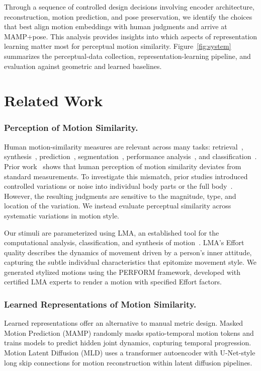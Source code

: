\documentclass[letterpaper]{article} %
\begin{document}
Through a sequence of controlled design decisions involving encoder architecture, reconstruction, motion prediction, and pose preservation, we identify the choices that best align motion embeddings with human judgments and arrive at MAMP+pose. This analysis provides insights into which aspects of representation learning matter most for perceptual motion similarity.  Figure~\ref{fig:system} summarizes the perceptual-data collection, representation-learning pipeline, and evaluation against geometric and learned baselines.

\section{Related Work}
\label{sec:related}

\subsubsection{Perception of Motion Similarity.}
 Human motion-similarity measures are relevant across many tasks: retrieval~\citep{Wang2015, Aristidou2018}, synthesis~\citep{Kovar2002}, prediction~\citep{Fragkiadaki2015, Martinez2017},  segmentation~\citep{Aristidou2018},  performance analysis~\citep{Chua2003}, and classification~\citep{Muller2006}.  Prior work~\citep{Durupinar2021-zk, Etemad2016-sg, Tang2008-pa} shows that human perception of motion similarity deviates from standard measurements. To investigate this mismatch, prior studies introduced controlled variations or noise into individual body parts or the full body~\citep{Hodgins1998-su, Reitsma2003-ac}. However, the resulting judgments are sensitive to the magnitude, type, and location of the variation. We instead evaluate perceptual similarity across systematic variations in motion style.
 
Our stimuli are parameterized using LMA, an established tool for the computational analysis, classification, and synthesis of motion~\citep{Ajili2019-sk, Aristidou2015-pg, Bernstein2015-oe, Burton2016-sr, Kapadia-2013}. LMA's Effort quality describes the dynamics of movement driven by a person's inner attitude, capturing the subtle individual characteristics that epitomize movement style. We generated stylized motions using the PERFORM framework, developed with certified LMA experts to render a motion with specified Effort factors.

 
\subsubsection{Learned Representations of Motion Similarity.}
Learned representations offer an alternative to manual metric design. Masked Motion Prediction (MAMP) \citep{mao2023mamp} randomly masks spatio-temporal motion tokens and trains models to predict hidden joint dynamics, capturing temporal progression. Motion Latent Diffusion (MLD) \citep{chen2023mld} uses a transformer autoencoder with U-Net-style long skip connections for motion reconstruction within latent diffusion pipelines. 
\end{document}
